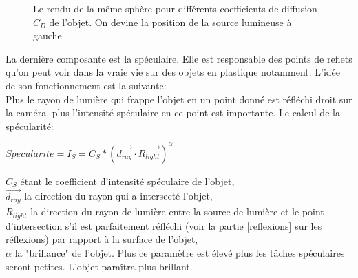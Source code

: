 \documentclass[11pt]{article}
\begin{document}
\begin{figure}[h!]

	\caption{Le rendu de la même sphère pour différents coefficients de diffusion $C_D$ de l'objet. On devine la position de la source lumineuse à gauche.}
	\label{differentDiffuse}
\end{figure}
\FloatBarrier

La dernière composante est la spéculaire. Elle est responsable des points de reflets qu'on peut voir dans la vraie vie sur des objets en plastique notamment. L'idée de son fonctionnement est la suivante:\\
Plus le rayon de lumière qui frappe l'objet en un point donné est réfléchi droit sur la caméra, plus l'intensité spéculaire en ce point est importante. Le calcul de la spécularité:

\begin{center}
	$Specularite = I_S = C_S*(\overrightarrow{d_{ray}}\cdot\overrightarrow{R_{light}})^\alpha$
\end{center}
$C_S$ étant le coefficient d'intensité spéculaire de l'objet,\\
$\overrightarrow{d_{ray}}$ la direction du rayon qui a intersecté l'objet,\\
$\overrightarrow{R_{light}}$ la direction du rayon de lumière entre la source de lumière et le point d'intersection s'il est parfaitement réfléchi (voir la partie \ref{reflexions} sur les réflexions) par rapport à la surface de l'objet,\\
$\alpha$ la "brillance" de l'objet. Plus ce paramètre est élevé plus les tâches spéculaires seront petites. L'objet paraîtra plus brillant.
\end{document}
